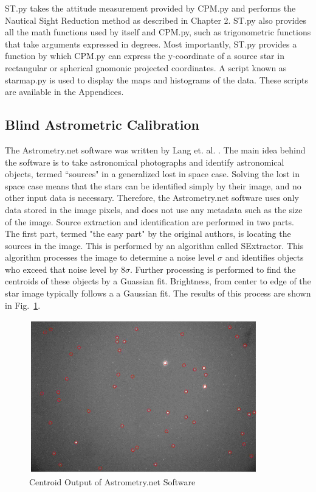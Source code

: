 \documentclass[12pt,a4paper]{book}
\begin{document}
ST.py takes the attitude measurement provided by CPM.py and performs the Nautical Sight Reduction method as described in Chapter 2. ST.py also provides all the math functions used by itself and CPM.py, such as trigonometric functions that take arguments expressed in degrees.  Most importantly, ST.py provides a function by which CPM.py can express the y-coordinate of a source star in rectangular or spherical gnomonic projected coordinates.  A script known as starmap.py is used to display the maps and histograms of the data.  These scripts are available in the Appendices.  
\subsection{Blind Astrometric Calibration}
The Astrometry.net software was written by Lang et. al.  \cite{b:astro}.  The main idea behind the software is to take astronomical photographs and identify astronomical objects, termed ``sources" in a generalized lost in space case. Solving the lost in space case means that the stars can be identified simply by their image, and no other input data is necessary. Therefore, the Astrometry.net software uses only data stored in the image pixels, and does not use any metadata such as the size of the image.  Source extraction and identification are performed in two parts.  The first part, termed "the easy part" by the original authors, is locating the sources in the image.  This is performed by an algorithm called SExtractor.  This algorithm processes the image to determine a noise level $\sigma$ and identifies objects who exceed that noise level by $8\sigma$.  Further processing is performed to find the centroids of these objects by a Guassian fit.  Brightness, from center to edge of the star image typically follows a a Gaussian fit.  The results of this process are shown in Fig.~\ref{f:centroids}.
\begin{figure}[!ht]%
\centering
 \includegraphics[width=10cm]{centroids.png}
 \caption{Centroid Output of Astrometry.net Software}
\label{f:centroids}
\end{figure} 
\end{document}
